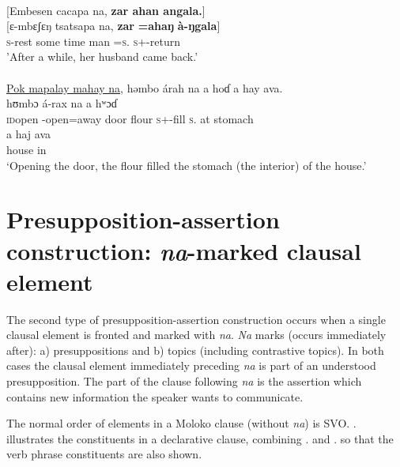 \ea \label{ex:11:26}
\\
{}[Embesen  cacapa  na,  \textbf{zar  ahan  angala.}]\\ 
\gll  {}[ɛ{}-mbɛʃɛŋ  tsatsapa  na, \textbf{zar} \textbf{=ahaŋ}  \textbf{à-ŋgala}]\\
      \textsc{s}-rest {some time} {\PSP}  man  =\textsc{s}.{\POSS} \textsc{s}+{\PFV}-return\\
\glt  'After a while, her husband came back.'\\
\medskip
{}\\
 \underline{Pok  mapalay  mahay  na},  həmbo  árah  na  a  hoɗ  a  hay  ava.\\
\gll  {}        hʊmbɔ  á-rax   na   a  hʷɔɗ\\ 
      \textsc{id}open  {\NOM}{}-open=away  door {\PSP}  flour \textsc{s}+{\IFV}-fill \textsc{s}.{\DO}  at  stomach\\ 
      
      \medskip
\gll a  haj    ava\\
     {\GEN}  house  in\\
\glt  ‘Opening the door, the flour filled the stomach (the interior) of the house.’
\z

\section{Presupposition-assertion construction: \textit{na}-marked clausal element}\label{sec:11.2}
\hypertarget{RefHeading1213241525720847}{}
The second type of presupposition-assertion construction occurs when a single clausal element is fronted and marked with \textit{na}. \textit{Na} marks (occurs immediately after): a) presuppositions and b) topics (including contrastive topics). In both cases the clausal element immediately preceding \textit{na}  is part of an understood presupposition. The part of the clause following \textit{na} is the assertion which contains new information the speaker wants to communicate.

The normal order of elements in a Moloko clause (without \textit{na}) is SVO. . illustrates the constituents in a declarative clause, combining . and . so that the verb phrase constituents are also shown.  

